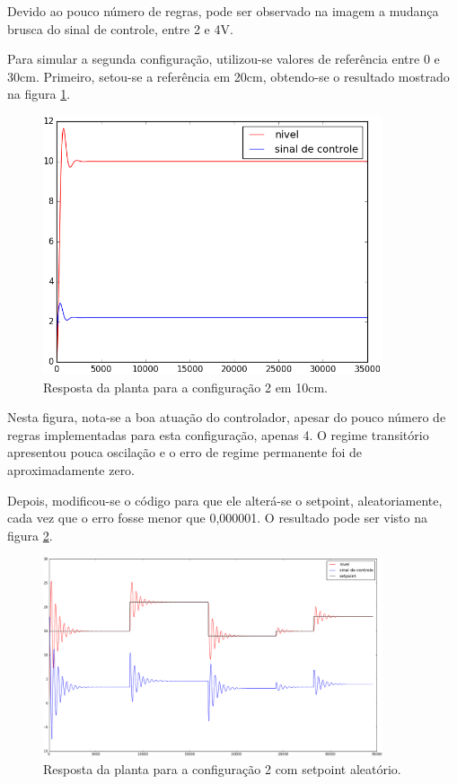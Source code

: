 \documentclass[a4paper,12pt]{article}
\begin{document}
Devido ao pouco número de regras, pode ser observado na imagem a mudança brusca do sinal de controle, entre 2 e 4V.

Para simular a segunda configuração, utilizou-se valores de referência entre 0 e 30cm. Primeiro, setou-se a referência em 20cm, obtendo-se o resultado mostrado na figura \ref{10cmc2}.

\begin{figure}[ht!]
\caption{Resposta da planta para a configuração 2 em 10cm. \label{10cmc2}}
\centering
\includegraphics[width=100mm]{Imagens/Figura_Questao2.png}
\end{figure}

Nesta figura, nota-se a boa atuação do controlador, apesar do pouco número de regras implementadas para esta configuração, apenas 4. O regime transitório apresentou pouca oscilação e o erro de regime permanente foi de aproximadamente zero.

Depois, modificou-se o código para que ele alterá-se o setpoint, aleatoriamente, cada vez que o erro fosse menor que 0,000001. O resultado pode ser visto na figura \ref{c2_aleatorio}.

\begin{figure}[ht!]
\caption{Resposta da planta para a configuração 2 com setpoint aleatório. \label{c2_aleatorio}}
\centering
\includegraphics[width=100mm]{Imagens/figure_2_PID.png}
\end{figure}
\end{document}
